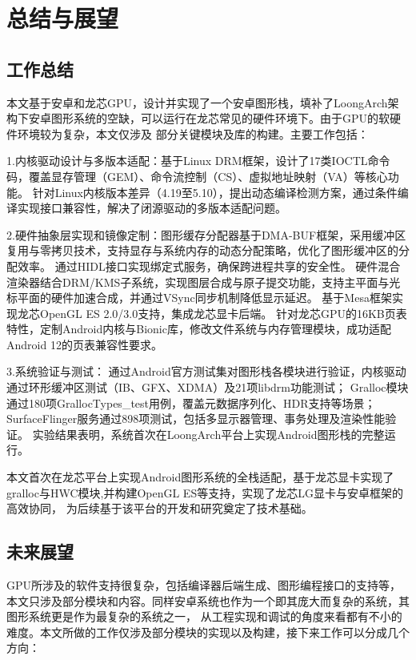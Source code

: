 
\chapter{总结与展望}

\section{工作总结}

本文基于安卓和龙芯GPU，设计并实现了一个安卓图形栈，填补了LoongArch架构下安卓图形系统的空缺，可以运行在龙芯常见的硬件环境下。由于GPU的软硬件环境较为复杂，本文仅涉及
部分关键模块及库的构建。主要工作包括：

1.内核驱动设计与多版本适配：基于Linux DRM框架，设计了17类IOCTL命令码，覆盖显存管理（GEM）、命令流控制（CS）、虚拟地址映射（VA）等核心功能。
针对Linux内核版本差异（4.19至5.10），提出动态编译检测方案，通过条件编译实现接口兼容性，解决了闭源驱动的多版本适配问题。

2.硬件抽象层实现和镜像定制：图形缓存分配器基于DMA-BUF框架，采用缓冲区复用与零拷贝技术，支持显存与系统内存的动态分配策略，优化了图形缓冲区的分配效率。
通过HIDL接口实现绑定式服务，确保跨进程共享的安全性。
硬件混合渲染器结合DRM/KMS子系统，实现图层合成与原子提交功能，支持主平面与光标平面的硬件加速合成，并通过VSync同步机制降低显示延迟。
基于Mesa框架实现龙芯OpenGL ES 2.0/3.0支持，集成龙芯显卡后端。
针对龙芯GPU的16KB页表特性，定制Android内核与Bionic库，修改文件系统与内存管理模块，成功适配Android 12的页表兼容性要求。

3.系统验证与测试：
通过Android官方测试集对图形栈各模块进行验证，内核驱动通过环形缓冲区测试（IB、GFX、XDMA）及21项libdrm功能测试；
Gralloc模块通过180项GrallocTypes\_test用例，覆盖元数据序列化、HDR支持等场景；
SurfaceFlinger服务通过898项测试，包括多显示器管理、事务处理及渲染性能验证。
实验结果表明，系统首次在LoongArch平台上实现Android图形栈的完整运行。

本文首次在龙芯平台上实现Android图形系统的全栈适配，基于龙芯显卡实现了gralloc与HWC模块,并构建OpenGL ES等支持，实现了龙芯LG显卡与安卓框架的高效协同，
为后续基于该平台的开发和研究奠定了技术基础。

\section{未来展望}

GPU所涉及的软件支持很复杂，包括编译器后端生成、图形编程接口的支持等，本文只涉及部分模块和内容。同样安卓系统也作为一个即其庞大而复杂的系统，其图形系统更是作为最复杂的系统之一，
从工程实现和调试的角度来看都有不小的难度。本文所做的工作仅涉及部分模块的实现以及构建，接下来工作可以分成几个方向：

